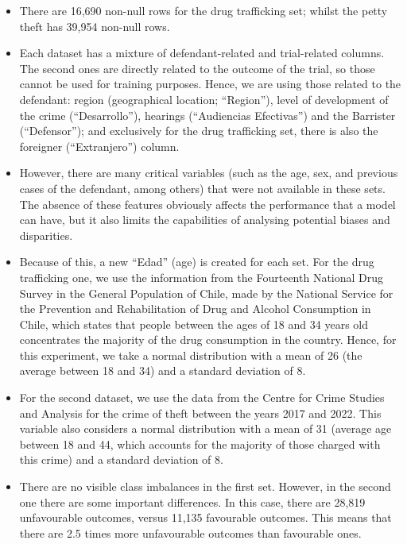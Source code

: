 \documentclass[twoside,11pt]{article}
\begin{document}
    \begin{itemize}
        \item There are 16,690 non-null rows for the drug trafficking set; whilst the petty theft has 39,954 non-null rows.
        
        \item Each dataset has a mixture of defendant-related and trial-related columns. The second ones are directly related to the outcome of the trial, so those cannot be used for training purposes. Hence, we are using those related to the defendant: region (geographical location; ``Region''), level of development of the crime (``Desarrollo''), hearings (``Audiencias Efectivas'') and the Barrister (``Defensor''); and exclusively for the drug trafficking set, there is also the foreigner (``Extranjero'') column.  
        
        \item However, there are many critical variables (such as the age, sex, and previous cases of the defendant, among others) that were not available in these sets. The absence of these features obviously affects the performance that a model can have, but it also limits the capabilities of analysing potential biases and disparities.
        
        \item Because of this, a new ``Edad'' (age) is created for each set. For the drug trafficking one, we use the information from the Fourteenth National Drug Survey in the General Population of Chile, made by the National Service for the Prevention and Rehabilitation of Drug and Alcohol Consumption  in Chile, which states that people between the ages of 18 and 34 years old concentrates the majority of the drug consumption in the country. Hence, for this experiment, we take a normal distribution with a mean of 26 (the average between 18 and 34) and a standard deviation of 8. 
        
        \item For the second dataset, we use the data from the Centre for Crime Studies and Analysis  for the crime of theft between the years 2017 and 2022. This variable also considers a normal distribution with a mean of 31 (average age between 18 and 44, which accounts for the majority of those charged with this crime) and a standard deviation of 8. 
        
        \item There are no visible class imbalances in the first set. However, in the second one there are some important differences. In this case, there are 28,819 unfavourable outcomes, versus 11,135 favourable outcomes. This means that there are 2.5 times more unfavourable outcomes than favourable ones.
        
    \end{itemize}
\end{document}
